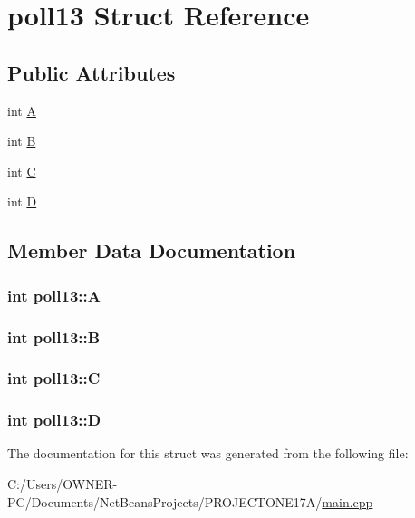 \hypertarget{structpoll13}{\section{poll13 Struct Reference}
\label{structpoll13}
}
\subsection*{Public Attributes}
\begin{DoxyCompactItemize}
\item 
int \hyperlink{structpoll13_a4328ed54d104068c7ce93b73610a7db4}{A}
\item 
int \hyperlink{structpoll13_a0fbb82bd4d45efb069e775ec1e7a58f7}{B}
\item 
int \hyperlink{structpoll13_a1678badf8626f11123d346997a39d9c9}{C}
\item 
int \hyperlink{structpoll13_a2eef58874d241adc39822b5628e107ae}{D}
\end{DoxyCompactItemize}


\subsection{Member Data Documentation}
\hypertarget{structpoll13_a4328ed54d104068c7ce93b73610a7db4}{
\subsubsection[{A}]{\setlength{\rightskip}{0pt plus 5cm}int poll13\+::\+A}}\label{structpoll13_a4328ed54d104068c7ce93b73610a7db4}
\hypertarget{structpoll13_a0fbb82bd4d45efb069e775ec1e7a58f7}{
\subsubsection[{B}]{\setlength{\rightskip}{0pt plus 5cm}int poll13\+::\+B}}\label{structpoll13_a0fbb82bd4d45efb069e775ec1e7a58f7}
\hypertarget{structpoll13_a1678badf8626f11123d346997a39d9c9}{
\subsubsection[{C}]{\setlength{\rightskip}{0pt plus 5cm}int poll13\+::\+C}}\label{structpoll13_a1678badf8626f11123d346997a39d9c9}
\hypertarget{structpoll13_a2eef58874d241adc39822b5628e107ae}{
\subsubsection[{D}]{\setlength{\rightskip}{0pt plus 5cm}int poll13\+::\+D}}\label{structpoll13_a2eef58874d241adc39822b5628e107ae}


The documentation for this struct was generated from the following file\+:\begin{DoxyCompactItemize}
\item 
C\+:/\+Users/\+O\+W\+N\+E\+R-\/\+P\+C/\+Documents/\+Net\+Beans\+Projects/\+P\+R\+O\+J\+E\+C\+T\+O\+N\+E17\+A/\hyperlink{main_8cpp}{main.\+cpp}\end{DoxyCompactItemize}
